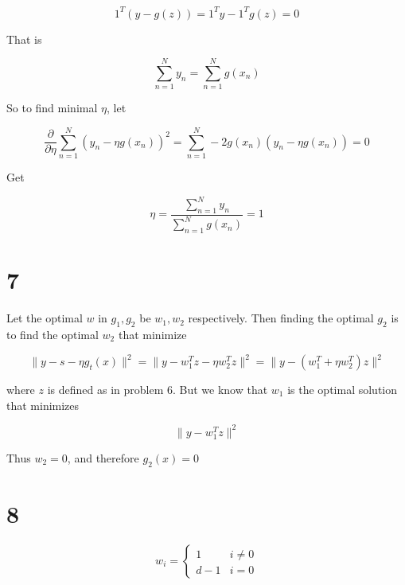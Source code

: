 \documentclass[fleqn,a4paper,12pt]{article}
\begin{document}
\begin{equation*}
  1^T(y - g(z)) = 1^T y - 1^T g(z) = 0
\end{equation*}

That is

\begin{equation*}
  \sum_{n=1}^N y_n = \sum_{n=1}^N g(x_n)
\end{equation*}

So to find minimal $\eta$, let

\begin{equation*}
  \frac{\partial}{\partial \eta} \sum_{n=1}^{N} (y_n - \eta g(x_n))^2 = \sum_{n=1}^N -2 g(x_n) (y_n - \eta g(x_n)) = 0
\end{equation*}

Get

\begin{equation*}
  \eta = \frac{\sum_{n=1}^N y_n}{\sum_{n=1}^N g(x_n)} = 1
\end{equation*}

\section*{7}

Let the optimal $w$ in $g_1, g_2$ be $w_1, w_2$ respectively. Then finding the optimal $g_2$ is to find the optimal $w_2$ that minimize

\begin{equation*}
  \lVert y - s - \eta g_t(x) \rVert^2 = \lVert y - w_1^T z - \eta w_2^T z \rVert^2 = \lVert y - (w_1^T +  \eta w_2^T) z \rVert^2
\end{equation*}

where $z$ is defined as in problem 6. But we know that $w_1$ is the optimal solution that minimizes 

\begin{equation*}
  \lVert y - w_1^T z \rVert^2
\end{equation*}

Thus $w_2 = 0$, and therefore $g_2(x) = 0$

\section*{8}

\begin{equation*}
w_i =
\begin{cases}
  1 & i \ne 0 \\
  d - 1 & i = 0
\end{cases}
\end{equation*}
\end{document}
